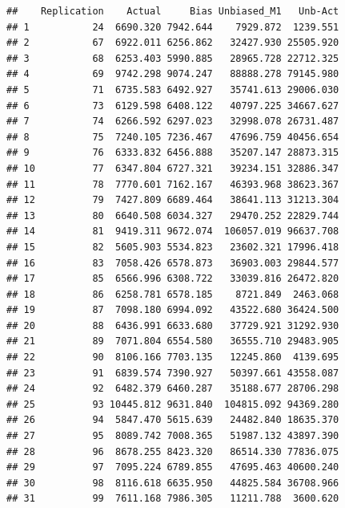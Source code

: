 \documentclass[]{article}
\newenvironment{Shaded}{\begin{snugshade}}{\end{snugshade}}
\newcommand{\KeywordTok}[1]{\textcolor[rgb]{0.13,0.29,0.53}{\textbf{#1}}}
\newcommand{\DataTypeTok}[1]{\textcolor[rgb]{0.13,0.29,0.53}{#1}}
\newcommand{\DecValTok}[1]{\textcolor[rgb]{0.00,0.00,0.81}{#1}}
\newcommand{\StringTok}[1]{\textcolor[rgb]{0.31,0.60,0.02}{#1}}
\newcommand{\OperatorTok}[1]{\textcolor[rgb]{0.81,0.36,0.00}{\textbf{#1}}}
\newcommand{\NormalTok}[1]{#1}
\begin{document}
\begin{Shaded}
\end{Shaded}

\begin{verbatim}
##    Replication    Actual     Bias Unbiased_M1   Unb-Act
## 1           24  6690.320 7942.644    7929.872  1239.551
## 2           67  6922.011 6256.862   32427.930 25505.920
## 3           68  6253.403 5990.885   28965.728 22712.325
## 4           69  9742.298 9074.247   88888.278 79145.980
## 5           71  6735.583 6492.927   35741.613 29006.030
## 6           73  6129.598 6408.122   40797.225 34667.627
## 7           74  6266.592 6297.023   32998.078 26731.487
## 8           75  7240.105 7236.467   47696.759 40456.654
## 9           76  6333.832 6456.888   35207.147 28873.315
## 10          77  6347.804 6727.321   39234.151 32886.347
## 11          78  7770.601 7162.167   46393.968 38623.367
## 12          79  7427.809 6689.464   38641.113 31213.304
## 13          80  6640.508 6034.327   29470.252 22829.744
## 14          81  9419.311 9672.074  106057.019 96637.708
## 15          82  5605.903 5534.823   23602.321 17996.418
## 16          83  7058.426 6578.873   36903.003 29844.577
## 17          85  6566.996 6308.722   33039.816 26472.820
## 18          86  6258.781 6578.185    8721.849  2463.068
## 19          87  7098.180 6994.092   43522.680 36424.500
## 20          88  6436.991 6633.680   37729.921 31292.930
## 21          89  7071.804 6554.580   36555.710 29483.905
## 22          90  8106.166 7703.135   12245.860  4139.695
## 23          91  6839.574 7390.927   50397.661 43558.087
## 24          92  6482.379 6460.287   35188.677 28706.298
## 25          93 10445.812 9631.840  104815.092 94369.280
## 26          94  5847.470 5615.639   24482.840 18635.370
## 27          95  8089.742 7008.365   51987.132 43897.390
## 28          96  8678.255 8423.320   86514.330 77836.075
## 29          97  7095.224 6789.855   47695.463 40600.240
## 30          98  8116.618 6635.950   44825.584 36708.966
## 31          99  7611.168 7986.305   11211.788  3600.620
\end{verbatim}
\end{document}

